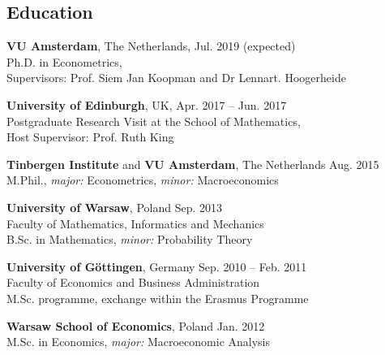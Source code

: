 \documentclass[margin,line]{resume}
\begin{document}
\begin{resume}
\vspace{-1mm}    
    \section{\mysidestyle Education}
    \textbf{VU Amsterdam},  The Netherlands, \hfill Jul. 2019 (expected)\\
	Ph.D. in Econometrics,\\ 
    Supervisors: Prof. Siem Jan Koopman and Dr Lennart. Hoogerheide

\vspace{-1mm}

    \textbf{University of Edinburgh},  UK, \hfill Apr. 2017 -- Jun. 2017\\
	Postgraduate Research Visit at the School of Mathematics,\\ 
    Host Supervisor: Prof. Ruth King

\vspace{-1mm}

    \textbf{Tinbergen Institute} and \textbf{VU Amsterdam}, The Netherlands  \hfill Aug. 2015 	\\
	M.Phil., \textit{major:} Econometrics, \textit{minor:} Macroeconomics 

\vspace{-1mm}

	\textbf{University of Warsaw}, Poland  \hfill Sep. 2013 	
	\vspace{1mm}\\
	Faculty of Mathematics, Informatics and Mechanics \\B.Sc. in Mathematics, \textit{minor:} Probability Theory 
    
\vspace{-1mm}

	\textbf{University of G{\"o}ttingen}, Germany   \hfill Sep. 2010 -- Feb. 2011	\\
    Faculty of Economics and Business Administration \\M.Sc. programme, exchange within the Erasmus Programme

\vspace{-1mm}

	\textbf{Warsaw School of Economics}, Poland   \hfill  Jan. 2012\\
	M.Sc. in Economics, \textit{major:} Macroeconomic Analysis

\vspace{-1mm}


\end{resume}
\end{document}
